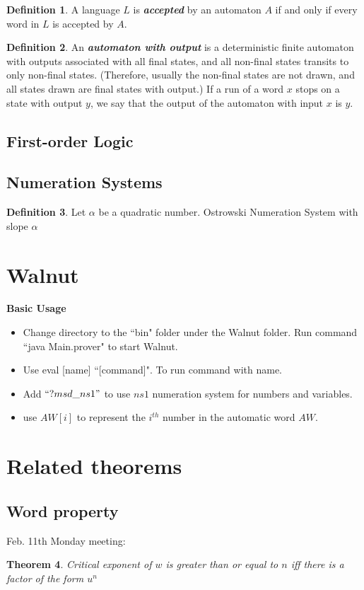 \documentclass{article}
\theoremstyle{definition}
\newtheorem{definition}{Definition}[section]
\theoremstyle{remark}
\theoremstyle{remark}
\theoremstyle{plain}
\newtheorem{theorem}[definition]{Theorem}
\theoremstyle{definition}
\newcommand{\term}[1]{\emph{\textbf{#1}}}
\begin{document}
\begin{definition}
A language $L$ is \term{accepted} by an automaton $A$ if and only if every word in $L$ is accepted by $A$.
\end{definition}

\begin{definition}
An \term{automaton with output} is a deterministic finite automaton with outputs associated with all final states, and all non-final states transits to only non-final states. (Therefore, usually the non-final states are not drawn, and all states drawn are final states with output.) If a run of a word $x$ stops on a state with output $y$, we say that the output of the automaton with input $x$ is $y$. 
\end{definition}


\subsection{First-order Logic}

\subsection{Numeration Systems}
\begin{definition}
Let $\alpha$ be a quadratic number. Ostrowski Numeration System with slope $\alpha$ 
\end{definition}
\section{Walnut}
\textbf{Basic Usage}
\begin{itemize}
    \item  Change directory to the ``bin" folder under the Walnut folder. Run command ``java Main.prover" to start Walnut. 
    \item Use eval [name] ``[command]". To run command with name.
    \item Add $``?msd\_ns1"$ to use $ns1$ numeration system for numbers and variables.
    \item use $AW[i]$ to represent the $i^{th}$ number in the automatic word $AW$.
\end{itemize}

\section{Related theorems}
\subsection{Word property}
Feb. 11th Monday meeting:
\begin{theorem}
Critical exponent of $w$ is greater than or equal to $n$ iff there is a factor of the form $u^n$
\end{theorem}
\end{document}
